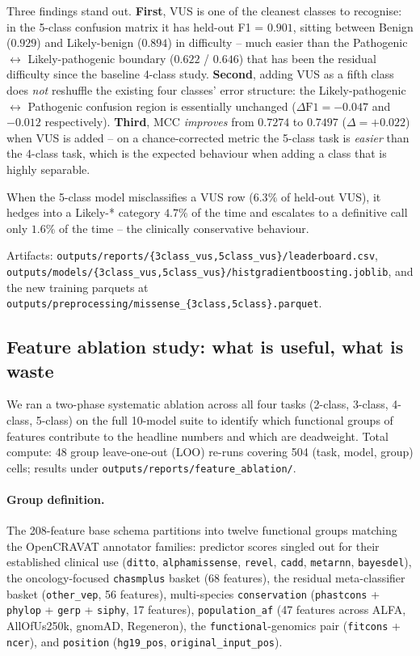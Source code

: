 \documentclass[11pt,a4paper]{article}
\begin{document}
Three findings stand out. \textbf{First}, VUS is one of the cleanest
classes to recognise: in the 5-class confusion matrix it has held-out
F1 = $0.901$, sitting between Benign ($0.929$) and Likely-benign ($0.894$)
in difficulty -- much easier than the Pathogenic $\leftrightarrow$
Likely-pathogenic boundary ($0.622$ / $0.646$) that has been the
residual difficulty since the baseline 4-class study. \textbf{Second},
adding VUS as a fifth class does \emph{not} reshuffle the existing four
classes' error structure: the Likely-pathogenic $\leftrightarrow$
Pathogenic confusion region is essentially unchanged
($\Delta\text{F1} = -0.047$ and $-0.012$ respectively). \textbf{Third},
MCC \emph{improves} from $0.7274$ to $0.7497$ ($\Delta=+0.022$) when VUS
is added -- on a chance-corrected metric the 5-class task is
\emph{easier} than the 4-class task, which is the expected behaviour when
adding a class that is highly separable.

When the 5-class model misclassifies a VUS row ($6.3\%$ of held-out
VUS), it hedges into a Likely-* category $4.7\%$ of the time and
escalates to a definitive call only $1.6\%$ of the time -- the
clinically conservative behaviour.

Artifacts:
\texttt{outputs/reports/\{3class\_vus,5class\_vus\}/leaderboard.csv},
\texttt{outputs/models/\{3class\_vus,5class\_vus\}/histgradientboosting.joblib},
and the new training parquets at
\texttt{outputs/preprocessing/missense\_\{3class,5class\}.parquet}.

\subsection{Feature ablation study: what is useful, what is waste}
\label{sec:feature-ablation}

We ran a two-phase systematic ablation across all four tasks
(2-class, 3-class, 4-class, 5-class) on the full 10-model suite to
identify which functional groups of features contribute to the headline
numbers and which are deadweight. Total compute: 48 group leave-one-out
(LOO) re-runs covering 504 (task, model, group) cells; results under
\texttt{outputs/reports/feature\_ablation/}.

\paragraph{Group definition.}
The 208-feature base schema partitions into twelve functional groups
matching the OpenCRAVAT annotator families: predictor scores singled out
for their established clinical use (\texttt{ditto}, \texttt{alphamissense},
\texttt{revel}, \texttt{cadd}, \texttt{metarnn}, \texttt{bayesdel}), the
oncology-focused \texttt{chasmplus} basket (68 features), the
residual meta-classifier basket (\texttt{other\_vep}, 56 features),
multi-species \texttt{conservation} (\texttt{phastcons} + \texttt{phylop}
+ \texttt{gerp} + \texttt{siphy}, 17 features), \texttt{population\_af}
(47 features across ALFA, AllOfUs250k, gnomAD, Regeneron), the
\texttt{functional}-genomics pair (\texttt{fitcons} + \texttt{ncer}), and
\texttt{position} (\texttt{hg19\_pos}, \texttt{original\_input\_pos}).
\end{document}

